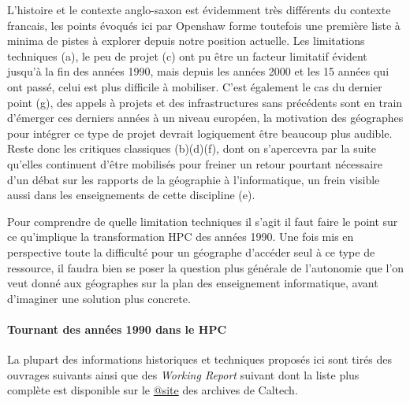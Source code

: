 L'histoire et le contexte anglo-saxon est évidemment très différents du contexte francais, les points évoqués ici par Openshaw forme toutefois une première liste à minima de pistes à explorer depuis notre position actuelle. Les limitations techniques (a), le peu de projet (c) ont pu être un facteur limitatif évident jusqu'à la fin des années 1990, mais depuis les années 2000 et les 15 années qui ont passé, celui est plus difficile à mobiliser. C'est également le cas du dernier point (g), des appels à projets et des infrastructures sans précédents sont en train d'émerger ces derniers années à un niveau européen, la motivation des géographes pour intégrer ce type de projet devrait logiquement être beaucoup plus audible. Reste donc les critiques classiques (b)(d)(f), dont on s'apercevra par la suite qu'elles continuent d'être mobilisés pour freiner un retour pourtant nécessaire d'un débat sur les rapports de la géographie à l'informatique, un frein visible aussi dans les enseignements de cette discipline (e). 

Pour comprendre de quelle limitation techniques il s'agit il faut faire le point sur ce qu'implique la transformation HPC des années 1990. Une fois mis en perspective toute la difficulté pour un géographe d'accéder seul à ce type de ressource, il faudra bien se poser la question plus générale de l'autonomie que l'on veut donné aux géographes sur la plan des enseignement informatique, avant d'imaginer une solution plus concrete.

\paragraph{Tournant des années 1990 dans le HPC}
\label{p:Tournant1980}

La plupart des informations historiques et techniques proposés ici sont tirés des ouvrages suivants \autocites{Fox1994, Fox1988, Seitz1985, CM2-1990, Lerman1993, Padua2011, Dietrich1984}[81-84]{Culler1998, Steele2011} ainsi que des \textit{Working Report} suivant \autocites{Athas1987, Su1987, Seitz1983, Seitz1984a, Seitz1984b} dont la liste plus complète est disponible sur le \href{http://authors.library.caltech.edu/view/person-az/Seitz-C-L.html}{@site} des archives de Caltech.

